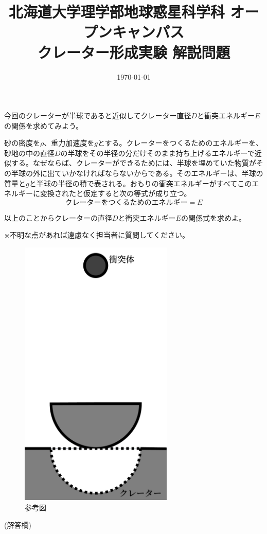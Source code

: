 \documentclass[a4paper, twocolumn]{ltjsarticle}
\begin{document}
\title{北海道大学理学部地球惑星科学科 オープンキャンパス\\クレーター形成実験 解説問題}
\date{\today}
\maketitle
\thispagestyle{empty}
今回のクレーターが半球であると近似してクレーター直径$D$と衝突エネルギー$E$の関係を求めてみよう。

砂の密度を$\rho$、重力加速度を$g$とする。クレーターをつくるためのエネルギーを、砂地の中の直径$D$の半球をその半径の分だけそのまま持ち上げるエネルギーで近似する。なぜならば、クレーターができるためには、半球を埋めていた物質がその半球の外に出ていかなければならないからである。そのエネルギーは、半球の質量と$g$と半球の半径の積で表される。おもりの衝突エネルギーがすべてこのエネルギーに変換されたと仮定すると次の等式が成り立つ。
\begin{equation}
    クレーターをつくるためのエネルギー = E
\end{equation}

以上のことからクレーターの直径$D$と衝突エネルギー$E$の関係式を求めよ。

※不明な点があれば遠慮なく担当者に質問してください。
\begin{figure}[H]
    \centering
    \includegraphics[height=13cm]{./figure/explanation_figure.pdf}
    \caption{参考図}
\end{figure}

(解答欄)
\end{document}
